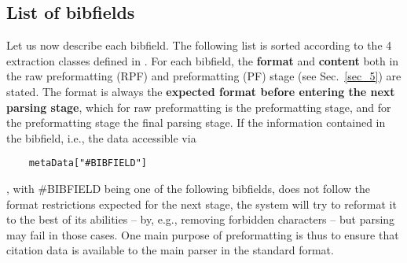 \documentclass[
a4paper,
12pt,
]
{article}
\begin{document}
 \subsection{List of bibfields}\label{app_bibfields_list} 
 Let us now describe each bibfield. The following list is sorted according to the 4 extraction classes defined in . For each bibfield, the \textbf{format} and \textbf{content} both in the raw preformatting (RPF) and preformatting (PF) stage (see Sec.~\ref{sec_5}) are stated. 
 The format is always the \textbf{expected format before entering the next parsing stage}, which for raw preformatting is the preformatting stage, and for the preformatting stage the final parsing stage. If the information contained in the bibfield, i.e., the data accessible via
	\begin{center}
	\begin{lstlisting}
	metaData["#BIBFIELD"]
	\end{lstlisting}
	\end{center}
 , with \#BIBFIELD being one of the following bibfields, does not follow the format restrictions expected for the next stage, the system will try to reformat it to the best of its abilities -- by, e.g., removing forbidden characters -- but parsing may fail in those cases. One main purpose of preformatting is thus to ensure that citation data is available to the main parser in the standard format. 
\end{document}
